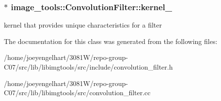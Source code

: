 \subsubsection[{\texorpdfstring{kernel\+\_\+}{kernel_}}]{$\ast$ image\+\_\+tools\+::\+Convolution\+Filter\+::kernel\+\_\+\hspace{0.3cm}{\ttfamily [private]}}\hypertarget{classimage__tools_1_1ConvolutionFilter_afb11679d9c73c3123ea0b1a14ae4d682}{}\label{classimage__tools_1_1ConvolutionFilter_afb11679d9c73c3123ea0b1a14ae4d682}
kernel that provides unique characteristics for a filter 

The documentation for this class was generated from the following files\+:\begin{DoxyCompactItemize}
\item 
/home/joeyengelhart/3081\+W/repo-\/group-\/\+C07/src/lib/libimgtools/src/include/convolution\+\_\+filter.\+h\item 
/home/joeyengelhart/3081\+W/repo-\/group-\/\+C07/src/lib/libimgtools/src/convolution\+\_\+filter.\+cc\end{DoxyCompactItemize}
